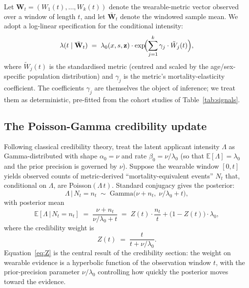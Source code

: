 \documentclass[11pt,a4paper]{article}
\theoremstyle{ia}
\newcommand{\E}{\mathbb{E}}
\newcommand{\1}{\mathbf{1}}
\newcommand{\given}{\,\vert\,}
\begin{document}
Let $\mathbf{W}_t = (W_1(t),\dots,W_k(t))$ denote the wearable-metric
vector observed over a window of length $t$, and let
$\bar{\mathbf{W}}_t$ denote the windowed sample mean. We adopt a
log-linear specification for the conditional intensity:
\begin{equation}\label{eq:loglinear}
   \lambda(t \mid \bar{\mathbf{W}}_t)
   \;=\; \lambda_0(x,s,\mathbf{z}) \cdot
         \exp\!\Bigl(\sum_{j=1}^k \gamma_j \cdot
                     \tilde W_j(t)\Bigr),
\end{equation}
where $\tilde W_j(t)$ is the standardised metric (centred and scaled
by the age/sex-specific population distribution) and $\gamma_j$ is
the metric's mortality-elasticity coefficient. The coefficients
$\gamma_j$ are themselves the object of inference; we treat them as
deterministic, pre-fitted from the cohort studies of
Table~\ref{tab:signals}.

\subsection{The Poisson-Gamma credibility update}\label{ss:cred-update}

Following classical credibility theory, treat the latent applicant
intensity $\Lambda$ as Gamma-distributed with shape
$\alpha_0=\nu$ and rate $\beta_0=\nu/\lambda_0$ (so that $\E[\Lambda]
= \lambda_0$ and the prior precision is governed by $\nu$). Suppose
the wearable window $[0,t]$ yields observed counts of metric-derived
``mortality-equivalent events'' $N_t$ that, conditional on $\Lambda$,
are Poisson$(\Lambda\,t)$. Standard conjugacy gives the posterior:
\begin{equation}\label{eq:posterior}
   \Lambda \given N_t = n_t \;\sim\;
   \mathrm{Gamma}\!\bigl(\nu + n_t,\;
                          \nu/\lambda_0 + t\bigr),
\end{equation}
with posterior mean
\begin{equation}\label{eq:postmean}
   \E[\Lambda \given N_t = n_t]
   \;=\; \frac{\nu + n_t}{\nu/\lambda_0 + t}
   \;=\; Z(t)\cdot \frac{n_t}{t}
        + \bigl(1-Z(t)\bigr)\cdot \lambda_0,
\end{equation}
where the credibility weight is
\begin{equation}\label{eq:Z}
   \boxed{\;Z(t) \;=\; \frac{t}{t + \nu/\lambda_0}.\;}
\end{equation}
Equation~\eqref{eq:Z} is the central result of the credibility
section: the weight on wearable evidence is a hyperbolic function of
the observation window $t$, with the prior-precision parameter
$\nu/\lambda_0$ controlling how quickly the posterior moves toward
the evidence.
\end{document}

